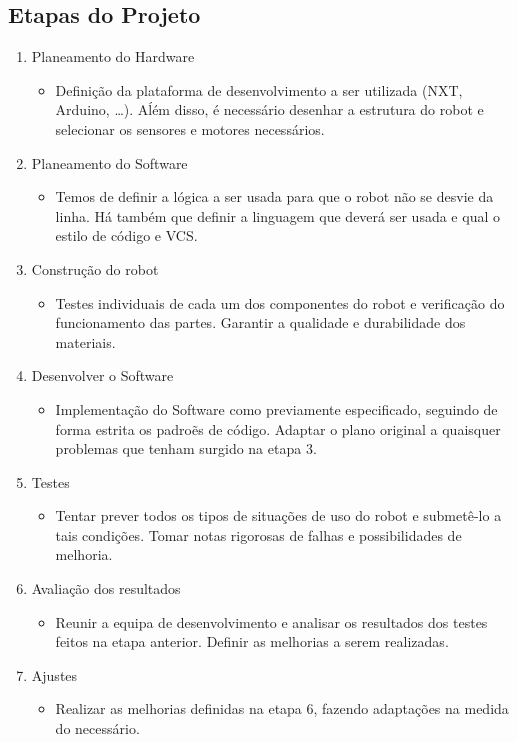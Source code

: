 \documentclass{article}
\begin{document}
\subsection*{Etapas do Projeto}
\begin{enumerate}
    \item Planeamento do Hardware
    \begin{itemize}
        \item Definição da plataforma de desenvolvimento a ser utilizada
              (NXT, Arduino, \dots). Aĺém disso, é necessário desenhar a
              estrutura do robot e selecionar os sensores e motores necessários.
    \end{itemize}
    \item Planeamento do Software
    \begin{itemize}
        \item Temos de definir a lógica a ser usada para que o robot não se
              desvie da linha. Há também que definir a linguagem que deverá ser
              usada e qual o estilo de código e VCS.
    \end{itemize}
    \item Construção do robot
    \begin{itemize}
        \item Testes individuais de cada um dos componentes do robot e
              verificação do funcionamento das partes. Garantir a qualidade e
              durabilidade dos materiais.
    \end{itemize}
    \item Desenvolver o Software
    \begin{itemize}
        \item Implementação do Software como previamente especificado, seguindo
              de forma estrita os padroẽs de código. Adaptar o plano original a
              quaisquer problemas que tenham surgido na etapa 3.
    \end{itemize}
    \item Testes
    \begin{itemize}
        \item Tentar prever todos os tipos de situações de uso do robot e
              submetê-lo a tais condições. Tomar notas rigorosas de falhas e
              possibilidades de melhoria.
    \end{itemize}
    \item Avaliação dos resultados
    \begin{itemize}
        \item Reunir a equipa de desenvolvimento e analisar os resultados dos
              testes feitos na etapa anterior. Definir as melhorias a serem
              realizadas.
    \end{itemize}
    \item Ajustes
    \begin{itemize}
        \item Realizar as melhorias definidas na etapa 6, fazendo adaptações na
              medida do necessário.
    \end{itemize}
\end{enumerate}
\end{document}
